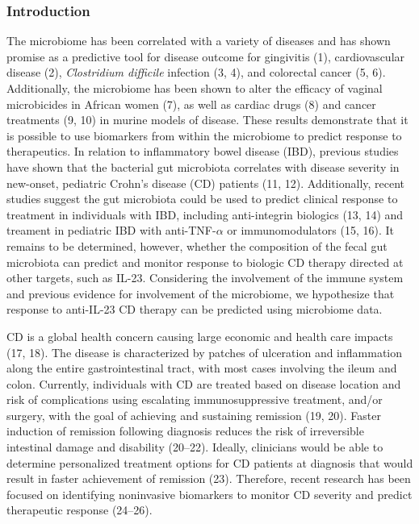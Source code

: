 \documentclass[12pt,]{article}
\begin{document}
\newpage

\subsubsection{Introduction}\label{introduction}

The microbiome has been correlated with a variety of diseases and has
shown promise as a predictive tool for disease outcome for gingivitis
(1), cardiovascular disease (2), \emph{Clostridium difficile} infection
(3, 4), and colorectal cancer (5, 6). Additionally, the microbiome has
been shown to alter the efficacy of vaginal microbicides in African
women (7), as well as cardiac drugs (8) and cancer treatments (9, 10) in
murine models of disease. These results demonstrate that it is possible
to use biomarkers from within the microbiome to predict response to
therapeutics. In relation to inflammatory bowel disease (IBD), previous
studies have shown that the bacterial gut microbiota correlates with
disease severity in new-onset, pediatric Crohn's disease (CD) patients
(11, 12). Additionally, recent studies suggest the gut microbiota could
be used to predict clinical response to treatment in individuals with
IBD, including anti-integrin biologics (13, 14) and treament in
pediatric IBD with anti-TNF-\({\alpha}\) or immunomodulators (15, 16).
It remains to be determined, however, whether the composition of the
fecal gut microbiota can predict and monitor response to biologic CD
therapy directed at other targets, such as IL-23. Considering the
involvement of the immune system and previous evidence for involvement
of the microbiome, we hypothesize that response to anti-IL-23 CD therapy
can be predicted using microbiome data.

CD is a global health concern causing large economic and health care
impacts (17, 18). The disease is characterized by patches of ulceration
and inflammation along the entire gastrointestinal tract, with most
cases involving the ileum and colon. Currently, individuals with CD are
treated based on disease location and risk of complications using
escalating immunosuppressive treatment, and/or surgery, with the goal of
achieving and sustaining remission (19, 20). Faster induction of
remission following diagnosis reduces the risk of irreversible
intestinal damage and disability (20--22). Ideally, clinicians would be
able to determine personalized treatment options for CD patients at
diagnosis that would result in faster achievement of remission (23).
Therefore, recent research has been focused on identifying noninvasive
biomarkers to monitor CD severity and predict therapeutic response
(24--26).
\end{document}
